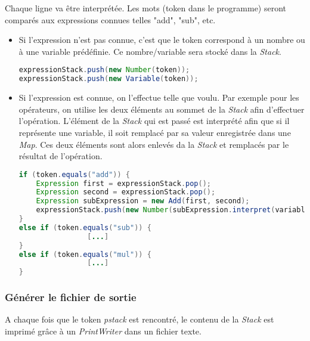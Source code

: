 \documentclass[a4paper]{article}
\begin{document}
Chaque ligne va être interprétée. Les mots (token dans le programme) seront comparés aux expressions connues telles "add", "sub", etc. 
\begin{itemize}
\item Si l'expression n'est pas connue, c'est que le token correspond à un nombre ou à une variable prédéfinie. Ce nombre/variable sera stocké dans la \textit{Stack}. 

\begin{lstlisting}[language=Java]
expressionStack.push(new Number(token));
expressionStack.push(new Variable(token));	
\end{lstlisting}
		
\item Si l'expression est connue, on l'effectue telle que voulu. Par exemple pour les opérateurs, on utilise les deux éléments au sommet de la \textit{Stack} afin d'effectuer l'opération. L'élément de la \textit{Stack} qui est passé est interprété afin que si il représente une variable, il soit remplacé par sa valeur enregistrée dans une \textit{Map}. Ces deux éléments sont alors enlevés da la \textit{Stack} et remplacés par le résultat de l'opération.

 
 \begin{lstlisting}[language=Java]
if (token.equals("add")) {
	Expression first = expressionStack.pop();
	Expression second = expressionStack.pop();
	Expression subExpression = new Add(first, second);
	expressionStack.push(new Number(subExpression.interpret(variables)));
} 
else if (token.equals("sub")) {
				[...]
} 
else if (token.equals("mul")) {
				[...]
}
\end{lstlisting}

\end{itemize}
\subsubsection*{Générer le fichier de sortie}
A chaque fois que le token \textit{pstack} est rencontré, le contenu de la \textit{Stack} est imprimé grâce à un \textit{PrintWriter} dans un fichier texte.
\end{document}
